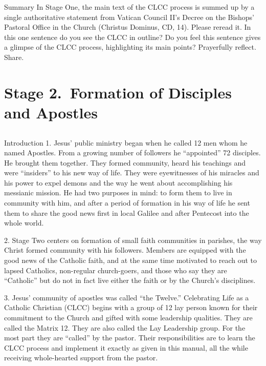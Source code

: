\documentclass[oneside]{book}
\begin{document}
Summary
In Stage One, the main text of the CLCC process is summed up by a single
authoritative statement from Vatican Council II's Decree on the Bishops'
Pastoral Office in the Church (Christus Dominus, CD, 14). Please reread it. In
this one sentence do you see the CLCC in outline? Do you feel this sentence
gives a glimpse of the CLCC process, highlighting its main points? Prayerfully
reflect. Share.


\chapter{Stage 2.\ Formation of Disciples and Apostles}

\section*{} 

Introduction
1. Jesus' public ministry began when he called 12 men whom he named
Apostles. From a growing number of followers he ``appointed'' 72 disciples. He
brought them together. They formed community, heard his teachings and were
``insiders'' to his new way of life. They were eyewitnesses of his miracles and
his power to expel demons and the way he went about accomplishing his messianic
mission. He had two purposes in mind: to form them to live in community with
him, and after a period of formation in his way of life he sent them to share
the good news first in local Galilee and after Pentecost into the whole world.

2. Stage Two centers on formation of small faith communities in parishes, the
way Christ formed community with his followers. Members are equipped with the
good news of the Catholic faith, and at the same time motivated to reach out to
lapsed Catholics, non-regular church-goers, and those who say they are
``Catholic'' but do not in fact live either the faith or by the Church's
disciplines.

3. Jesus' community of apostles was called ``the Twelve.'' Celebrating Life as a
Catholic Christian (CLCC) begins with a group of 12 lay person known for their
commitment to the Church and gifted with some leadership qualities. They are
called the Matrix 12. They are also called the Lay Leadership group. For the
most part they are ``called'' by the pastor. Their responsibilities are to learn
the CLCC process and implement it exactly as given in this manual, all the while
receiving whole-hearted support from the pastor.
\end{document}
